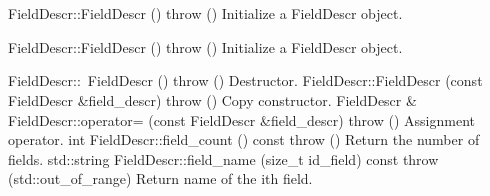 \documentclass{book}
\begin{document}
\section{}
\section{}
\section{}
\section{}
\section{}

\subsection{}


FieldDescr::FieldDescr () throw ()
 	Initialize a FieldDescr object.

FieldDescr::FieldDescr () throw ()
 	Initialize a FieldDescr object.

FieldDescr::~FieldDescr () throw ()
 	Destructor.
FieldDescr::FieldDescr (const FieldDescr \&field\_descr) throw ()
 	Copy constructor.
FieldDescr \& 	FieldDescr::operator= (const FieldDescr \&field\_descr) throw ()
 	Assignment operator.
int 	FieldDescr::field\_count () const throw ()
 	Return the number of fields.
std::string 	FieldDescr::field\_name (size\_t id\_field) const throw (std::out\_of\_range)
 	Return name of the ith field.
\end{document}
